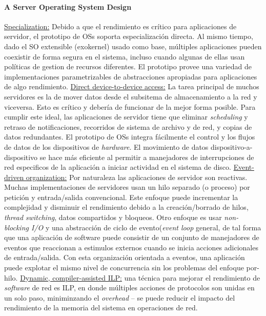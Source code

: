 \paragraph{\textnormal{\textbf{A Server Operating System Design}}}
\underline{Specialization:} Debido a que el rendimiento es crítico para aplicaciones de servidor, el prototipo de OSs soporta especialización directa. Al mismo tiempo, dado el SO extensible (exokernel) usado como base, múltiples aplicaciones pueden coexistir de forma segura en el sistema, incluso cuando algunas de ellas usan políticas de gestion de recursos diferentes. El prototipo provee una variedad de implementaciones parametrizables de abstracciones apropiadas para aplicaciones de algo rendimiento. \underline{Direct device-to-device access:} La tarea principal de muchos servidores es la de mover datos desde el subsitema de almacenamiento a la red y viceversa. Esto es crítico y debería de funcionar de la mejor forma posible. Para cumplir este ideal, las aplicaciones de servidor tiene que eliminar \textit{scheduling} y retraso de notificaciones, recorridos de sistema de archivo y de red, y copias de datos redundantes. El prototipo de OSs integra fácilmente el control y los flujos de datos de los dispositivos de \textit{hardware}. El movimiento de datos dispositivo-a-dispositivo se hace más eficiente al permitir a manejadores de interrupciones de red especificos de la aplicación a iniciar actividad en el sistema de disco. \underline{Event-driven organization:} Por naturaleza las aplicaciones de servidor son reactivas. Muchas implementaciones de servidores usan un hilo separado (o proceso) por petición y entrada/salida convencional. Este enfoque puede incrementar la complejidad y disminuir el rendimiento debido a la creación/borrado de hilos, \textit{thread switching}, datos compartidos y bloqueos. Otro enfoque es usar \textit{non-blocking I/O} y una abstracción de ciclo de evento(\textit{event loop} general, de tal forma que una aplicación de software puede consistir de un conjunto de manejadores de eventos que reaccionan a estimulos externos cuando se inicia acciones adicionales de entrada/salida. Con esta organización orientada a eventos, una aplicación puede explotar el mismo nivel de concurrencia sin los problemas del enfoque por-hilo. \underline{Dynamic, compiler-assisted ILP:} una técnica para mejorar el rendimiento de \textit{software} de red es ILP, en donde múltiples acciones de protocolos son unidas en un solo paso, miniminzando el \textit{overhead} -- se puede reducir el impacto del rendimiento de la memoria del sistema en operaciones de red.

